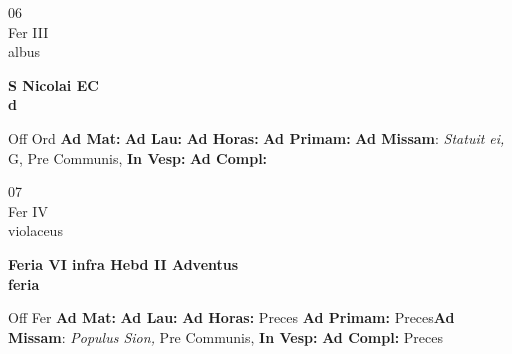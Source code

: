 \documentclass[10pt, openany]{book}
\begin{document}
    \begin{center}
        \begin{minipage}{3.5in}
            \vspace{2em}
            \begin{minipage}{0.5in}
                {\Huge 06} \\
                {\normalsize Fer III} \\
                {\normalsize albus}
            \end{minipage}
            \begin{minipage}{3.0in}
                \textbf{ \large S Nicolai EC \\
                \textnormal{\normalsize d}} \\ 
            \end{minipage}
            \begin{justify}Off Ord
                \textbf{Ad Mat: }
                \textbf{Ad Lau: }
                \textbf{Ad Horas: }
                \textbf{Ad Primam: }\textbf{Ad Missam}: \textit{Statuit ei,} G, Pre Communis,  
                \textbf{In Vesp: }
                \textbf{Ad Compl: }
            \end{justify}
        \end{minipage}
    \end{center}

    \begin{center}
        \begin{minipage}{3.5in}
            \vspace{2em}
            \begin{minipage}{0.5in}
                {\Huge 07} \\
                {\normalsize Fer IV} \\
                {\normalsize violaceus}
            \end{minipage}
            \begin{minipage}{3.0in}
                \textbf{ \large Feria VI infra Hebd II Adventus \\
                \textnormal{\normalsize feria}} \\ 
            \end{minipage}
            \begin{justify}Off Fer
                \textbf{Ad Mat: }
                \textbf{Ad Lau: }
                \textbf{Ad Horas: }Preces
                \textbf{Ad Primam: }Preces\textbf{Ad Missam}: \textit{Populus Sion,} Pre Communis,  
                \textbf{In Vesp: }
                \textbf{Ad Compl: }Preces
            \end{justify}
        \end{minipage}
    \end{center}
\end{document}
